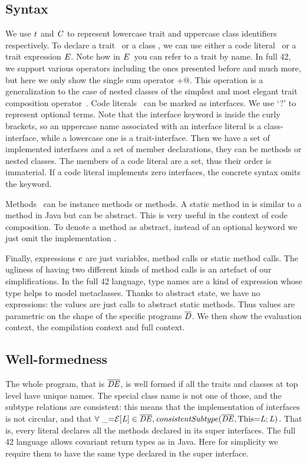 \subsection{Syntax}
\saveSpace
We use $\mathit{t}$ and $\mathit{C}$ to represent lowercase trait and uppercase class identifiers respectively.
To declare a trait \mTD\ or a class \mCD, we can use either a code literal \mL\ or a trait
expression $\mathit{E}$. Note how in $\mathit{E}$\ you can refer to a trait by name.
In full 42, we support various operators including the ones presented before and much more,
 but here we only show the single sum operator \Q@+@.
This operation is a generalization to the case of nested classes of the simplest and most elegant
trait composition operator~\cite{ducasse2006traits}.
Code literals \mL\ can be marked as interfaces. We use `?' to represent optional terms.
Note that the interface keyword is inside the curly brackets,
so an uppercase name associated with an interface literal is a class-interface, while a lowercase one is a trait-interface.
Then we have a set of implemented interfaces and a set of member
declarations, they can be methods or nested classes.
The members of a code literal are a set, thus their order is immaterial.
If a code literal implements zero interfaces, the concrete syntax omits the \Q@implements@ keyword.

Methods \mMD~can be instance methods or \Q@static@ methods. 
A static method in \name is similar to a \Q@static@ method in Java but can be abstract.
This is very useful in the context of code composition.
To denote a method as abstract, instead of an optional keyword we just omit the implementation \me.

Finally, expressions $\mathit{e}$ are just variables, method calls or static method calls.
The ugliness of having two different kinds of method calls is an artefact of our simplifications.
In the full 42 language, type names are a kind of expression whose type helps to model metaclasses.
Thanks to abstract state, we have no \Q@new@ expressions:
the values are just calls to abstract static methods.
Thus values are parametric on the shape of the specific programs $\overline{\mathit{D}}$.
We then show the evaluation context, the compilation context and full
context.
\saveSpace
\subsection{Well-formedness}
\saveSpace
The whole program, that is $\overline{\mathit{DE}}$, is well formed if
all the traits and classes at top level have unique names. The special class name
\Q@This@ is not one of those,
and the subtype relations are consistent:
this means that the implementation of interfaces is not circular,
and that $\forall\ \_\terminalCode{=}\ctx[\mL]\in\overline\mDE, \mathit{consistentSubtype}(\overline\mDE,\terminalCode{This=}\mL;\mL)$.
\quad That is, every literal declares
all the methods declared in its super interfaces.
The full 42 language allows covariant return types as in Java.
Here for simplicity we require them to have the same type declared in the super interface.


